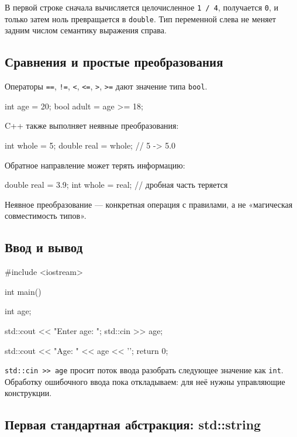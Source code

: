 В первой строке сначала вычисляется целочисленное \texttt{1 / 4}, получается
\texttt{0}, и только затем ноль превращается в \texttt{double}.
Тип переменной слева не меняет задним числом семантику выражения справа.

\subsection{Сравнения и простые преобразования}

Операторы \texttt{==}, \texttt{!=}, \texttt{<}, \texttt{<=}, \texttt{>},
\texttt{>=} дают значение типа \texttt{bool}.

\begin{cppcode}
int age = 20;
bool adult = age >= 18;
\end{cppcode}

C++ также выполняет неявные преобразования:

\begin{cppcode}
int whole = 5;
double real = whole;  // 5 -> 5.0
\end{cppcode}

Обратное направление может терять информацию:

\begin{cppcode}
double real = 3.9;
int whole = real;  // дробная часть теряется
\end{cppcode}

Неявное преобразование --- конкретная операция с правилами, а не «магическая
совместимость типов».

\subsection{Ввод и вывод}

\begin{cppcode}
#include <iostream>

int main() {
    int age{};

    std::cout << "Enter age: ";
    std::cin >> age;

    std::cout << "Age: " << age << '\n';
    return 0;
}
\end{cppcode}

\texttt{std::cin >> age} просит поток ввода разобрать следующее значение как
\texttt{int}. Обработку ошибочного ввода пока откладываем: для неё нужны
управляющие конструкции.

\subsection{Первая стандартная абстракция: std::string}


